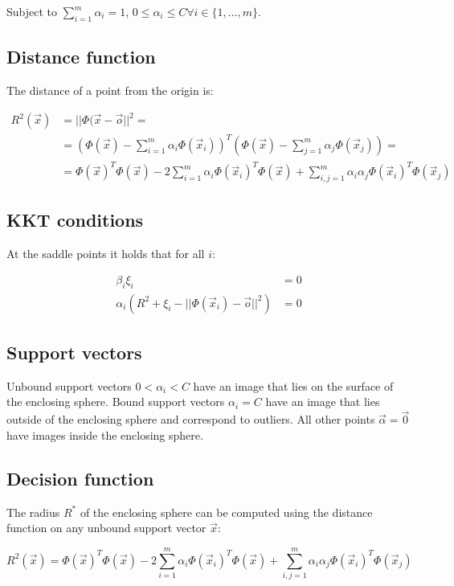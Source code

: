 	Subject to $\sum\limits_{i=1}^m\alpha_i=1$, $0\le\alpha_i\le C\forall i\in\{1, \dots, m\}$.

	\subsection{Distance function}
	The distance of a point from the origin is:

	\begin{align*}
		R^2(\vec{x}) &=||\Phi(\vec{x}-\vec{o}||^2=\\
								 &=(\Phi(\vec{x})-\sum\limits_{i=1}^m\alpha_i\Phi(\vec{x}_i))^T(\Phi(\vec{x})-\sum\limits_{j=1}^m\alpha_j\Phi(\vec{x}_j))=\\
								 &=\Phi(\vec{x})^T\Phi(\vec{x}) - 2\sum\limits_{i=1}^m\alpha_i\Phi(\vec{x}_i)^T\Phi(\vec{x}) + \sum\limits_{i,j=1}^m\alpha_i\alpha_j\Phi(\vec{x}_i)^T\Phi(\vec{x}_j)
	\end{align*}

	\subsection{KKT conditions}
	At the saddle points it holds that for all $i$:

	\begin{align*}
		\beta_i\xi_i &= 0\\
		\alpha_i(R^2+\xi_i-||\Phi(\vec{x}_i)-\vec{o}||^2) &=0
	\end{align*}

	\subsection{Support vectors}
	Unbound support vectors $0<\alpha_i<C$ have an image that lies on the surface of the enclosing sphere.
	Bound support vectors $\alpha_i = C$ have an image that lies outside of the enclosing sphere and correspond to outliers.
	All other points $\vec{\alpha} = \vec{0}$ have images inside the enclosing sphere.

	\subsection{Decision function}
	The radius $R^*$ of the enclosing sphere can be computed using the distance function on any unbound support vector $\vec{x}$:

	$$R^2(\vec{x}) = \Phi(\vec{x})^T\Phi(\vec{x})-2\sum\limits_{i=1}^m\alpha_i\Phi(\vec{x}_i)^T\Phi(\vec{x}) + \sum\limits_{i,j=1}^m\alpha_i\alpha_j\Phi(\vec{x}_i)^T\Phi(\vec{x}_j)$$

